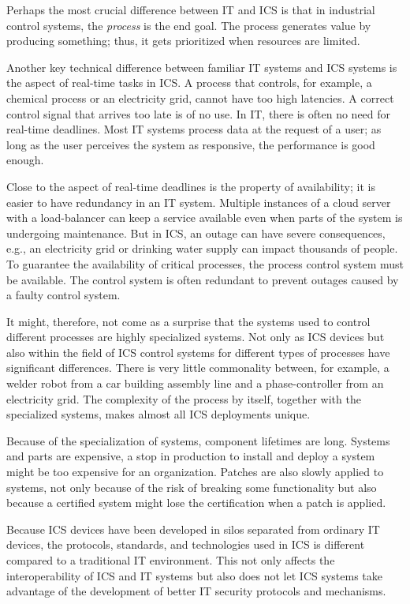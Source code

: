 Perhaps the most crucial difference between IT and ICS is that in industrial control systems, the \emph{process} is the end goal. The process generates value by producing something; thus, it gets prioritized when resources are limited.

Another key technical difference between familiar IT systems and ICS systems is the aspect of real-time tasks in ICS. A process that controls, for example, a chemical process or an electricity grid, cannot have too high latencies. A correct control signal that arrives too late is of no use. In IT, there is often no need for real-time deadlines. Most IT systems process data at the request of a user; as long as the user perceives the system as responsive, the performance is good enough.

Close to the aspect of real-time deadlines is the property of availability; it is easier to have redundancy in an IT system. Multiple instances of a cloud server with a load-balancer can keep a service available even when parts of the system is undergoing maintenance. But in ICS, an outage can have severe consequences, e.g., an electricity grid or drinking water supply can impact thousands of people. To guarantee the availability of critical processes, the process control system must be available. The control system is often redundant to prevent outages caused by a faulty control system.


It might, therefore, not come as a surprise that the systems used to control different processes are highly specialized systems. Not only as ICS devices but also within the field of ICS control systems for different types of processes have significant differences. There is very little commonality between, for example, a welder robot from a car building assembly line and a phase-controller from an electricity grid. The complexity of the process by itself, together with the specialized systems, makes almost all ICS deployments unique.

Because of the specialization of systems, component lifetimes are long. Systems and parts are expensive, a stop in production to install and deploy a system might be too expensive for an organization. Patches are also slowly applied to systems, not only because of the risk of breaking some functionality but also because a certified system might lose the certification when a patch is applied.

Because ICS devices have been developed in silos separated from ordinary IT devices, the protocols, standards, and technologies used in ICS is different compared to a traditional IT environment. This not only affects the interoperability of ICS and IT systems but also does not let ICS systems take advantage of the development of better IT security protocols and mechanisms.

